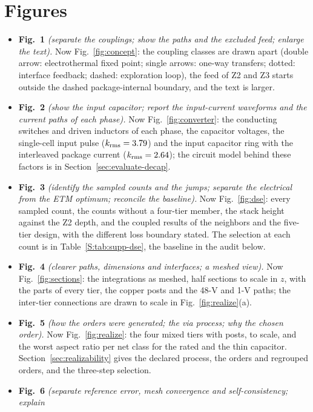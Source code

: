 \documentclass[10pt]{article}
\begin{document}
\section*{Figures}
\begin{itemize}
\item \textbf{Fig.~1} \emph{(separate the couplings; show the paths and the excluded feed; enlarge the
text).} Now Fig.~\ref{fig:concept}: the coupling classes are drawn apart (double arrow:
electrothermal fixed point; single arrows: one-way transfers; dotted: interface feedback; dashed:
exploration loop), the feed of Z2 and Z3 starts outside the dashed package-internal boundary, and the
text is larger.
\item \textbf{Fig.~2} \emph{(show the input capacitor; report the input-current waveforms and the
current paths of each phase).} Now Fig.~\ref{fig:converter}: the conducting switches and driven
inductors of each phase, the capacitor voltages, the single-cell input pulse
($k_{\mathrm{rms}} = 3.79$) and the input capacitor ring with the interleaved package current
($k_{\mathrm{rms}} = 2.64$); the circuit model behind these factors is in
Section~\ref{sec:evaluate-decap}.
\item \textbf{Fig.~3} \emph{(identify the sampled counts and the jumps; separate the electrical from
the ETM optimum; reconcile the baseline).} Now Fig.~\ref{fig:dse}: every sampled count, the counts
without a four-tier member, the stack height against the Z2 depth, and the coupled results of the
neighbors and the five-tier design, with the different loss boundary stated. The selection at each
count is in Table~\ref{S:tab:supp-dse}, the baseline in the audit below.
\item \textbf{Fig.~4} \emph{(clearer paths, dimensions and interfaces; a meshed view).} Now
Fig.~\ref{fig:sections}: the integrations as meshed, half sections to scale in $z$, with the parts of
every tier, the copper posts and the 48-V and 1-V paths; the inter-tier connections are drawn to scale
in Fig.~\ref{fig:realize}(a).
\item \textbf{Fig.~5} \emph{(how the orders were generated; the via process; why the chosen order).}
Now Fig.~\ref{fig:realize}: the four mixed tiers with posts, to scale, and the worst aspect ratio per
net class for the rated and the thin capacitor. Section~\ref{sec:realizability} gives the declared
process, the \MthNorders{} orders and \MthNregroup{} regrouped orders, and the three-step selection.
\item \textbf{Fig.~6} \emph{(separate reference error, mesh convergence and self-consistency; explain
}
\end{itemize}
\end{document}
